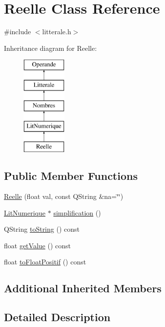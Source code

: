 \hypertarget{class_reelle}{}\section{Reelle Class Reference}
\label{class_reelle}


{\ttfamily \#include $<$litterale.\+h$>$}

Inheritance diagram for Reelle\+:\begin{figure}[H]
\begin{center}
\leavevmode
\includegraphics[height=5.000000cm]{class_reelle}
\end{center}
\end{figure}
\subsection*{Public Member Functions}
\begin{DoxyCompactItemize}
\item 
\hyperlink{class_reelle_a4820ed1f57d1779273fea064aa1717ed}{Reelle} (float val, const Q\+String \&na=\char`\"{}\char`\"{})
\item 
\hyperlink{class_lit_numerique}{Lit\+Numerique} $\ast$ \hyperlink{class_reelle_a17b1ff9af954561b42a2019fea324d33}{simplification} ()
\item 
Q\+String \hyperlink{class_reelle_add2eb8eb352c8bef1e5d51119b54bcb6}{to\+String} () const 
\item 
float \hyperlink{class_reelle_aeba394a540d867536d7d9799077f5afb}{get\+Value} () const 
\item 
float \hyperlink{class_reelle_aa707042f603c23f65b4c299fd7eff027}{to\+Float\+Positif} () const 
\end{DoxyCompactItemize}
\subsection*{Additional Inherited Members}


\subsection{Detailed Description}


